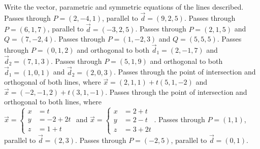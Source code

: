 
\begin{Exercise}[
name={},
title={}, 
difficulty=0,
origin={\cite{GHC}}]
Write the vector, parametric and symmetric equations of the lines described.
\Question Passes through $P=(2,-4,1)$, parallel to $\vec d=(9,2,5)$.
\Question Passes through $P=(6,1,7)$, parallel to $\vec d=(-3,2,5)$.
\Question Passes through $P=(2,1,5)$ and $Q = (7,-2,4)$.
\Question Passes through $P=(1,-2,3)$ and $Q = (5,5,5)$.
\Question Passes through $P=(0,1,2)$ and orthogonal to both $\vec d_1=(2,-1,7)$ and $\vec d_2=(7,1,3)$.
\Question Passes through $P=(5,1,9)$ and orthogonal to both $\vec d_1=(1,0,1)$ and $\vec d_2=(2,0,3)$.
\Question Passes through the point of intersection and orthogonal of both lines, where
$\vec x = (2,1,1) + t(5,1,-2)$ and \\$\vec x = (-2,-1,2)+t(3,1,-1)$.
\Question Passes through the point of intersection and orthogonal to both lines, where\\
$\vec x = \left\{\begin{aligned} x&=t\\y&=-2+2t\\z&=1+t\end{aligned}\right.$ \quad and \quad 
$\vec x = \left\{\begin{aligned} x&=2+t\\y&=2-t\\z&=3+2t\end{aligned}\right.$.
\Question Passes through $P=(1,1)$, parallel to $\vec d = (2,3)$.
\Question Passes through $P=(-2,5)$, parallel to $\vec d = (0,1)$.
\end{Exercise}
